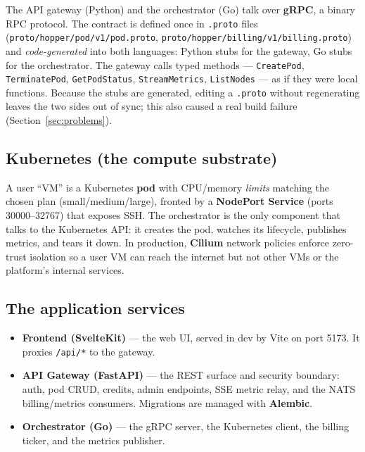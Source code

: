\documentclass[11pt,a4paper]{article}
\newcommand{\code}[1]{\texttt{\small #1}}
\begin{document}
The API gateway (Python) and the orchestrator (Go) talk over \textbf{gRPC}, a
binary RPC protocol. The contract is defined once in \code{.proto} files
(\code{proto/hopper/pod/v1/pod.proto},
\code{proto/hopper/billing/v1/billing.proto}) and \emph{code-generated} into both
languages: Python stubs for the gateway, Go stubs for the orchestrator. The
gateway calls typed methods --- \code{CreatePod}, \code{TerminatePod},
\code{GetPodStatus}, \code{StreamMetrics}, \code{ListNodes} --- as if they were
local functions. Because the stubs are generated, editing a \code{.proto} without
regenerating leaves the two sides out of sync; this also caused a real build
failure (Section~\ref{sec:problems}).

\subsection{Kubernetes (the compute substrate)}

A user ``VM'' is a Kubernetes \textbf{pod} with CPU/memory \emph{limits} matching
the chosen plan (small/medium/large), fronted by a \textbf{NodePort Service}
(ports 30000--32767) that exposes SSH. The orchestrator is the only component
that talks to the Kubernetes API: it creates the pod, watches its lifecycle,
publishes metrics, and tears it down. In production, \textbf{Cilium} network
policies enforce zero-trust isolation so a user VM can reach the internet but not
other VMs or the platform's internal services.

\subsection{The application services}

\begin{itemize}[nosep]
  \item \textbf{Frontend (SvelteKit)} --- the web UI, served in dev by Vite on
        port 5173. It proxies \code{/api/*} to the gateway.
  \item \textbf{API Gateway (FastAPI)} --- the REST surface and security boundary:
        auth, pod CRUD, credits, admin endpoints, SSE metric relay, and the NATS
        billing/metrics consumers. Migrations are managed with \textbf{Alembic}.
  \item \textbf{Orchestrator (Go)} --- the gRPC server, the Kubernetes client,
        the billing ticker, and the metrics publisher.
\end{itemize}

\end{document}
